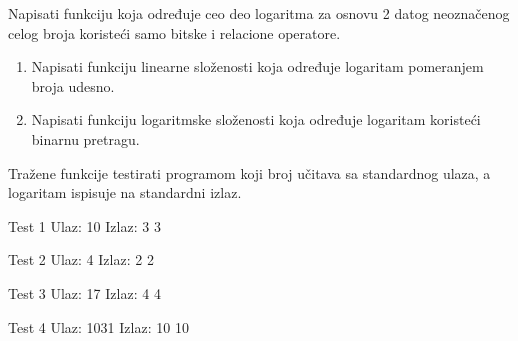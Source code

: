 \begin{Answer}[ref=408]
\end{Answer}
\begin{Exercise}[label=409]
  Napisati funkciju koja određuje ceo deo logaritma za osnovu 2 datog
  neoznačenog celog broja koristeći samo bitske i relacione
  operatore.
  \begin{enumerate}
  \item Napisati funkciju linearne složenosti koja određuje
    logaritam pomeranjem broja udesno.
  \item Napisati funkciju logaritmske složenosti koja određuje
    logaritam koristeći binarnu pretragu.
  \end{enumerate}
  Tražene funkcije testirati programom koji broj učitava sa
  standardnog ulaza, a logaritam ispisuje na standardni izlaz.
  
\begin{minitest}
\begin{test}{Test 1}
Ulaz:  10
Izlaz: 3 3
\end{test}
\end{minitest}
\begin{minitest}
\begin{test}{Test 2}
Ulaz:  4
Izlaz: 2 2
\end{test}
\end{minitest}
\begin{minitest}
  
\begin{test}{Test 3}
Ulaz:  17
Izlaz: 4 4
\end{test}
\end{minitest}
\begin{minitest}
\begin{test}{Test 4}
Ulaz:  1031
Izlaz: 10 10
\end{test}
\end{minitest}


\end{Exercise}

